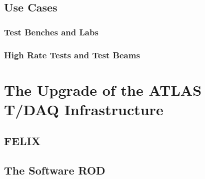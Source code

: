 \subsection{Use Cases}
\subsubsection{Test Benches and Labs}
\subsubsection{High Rate Tests and Test Beams}

\section{The Upgrade of the ATLAS T/DAQ Infrastructure}
\subsection{FELIX}
\subsection{The Software ROD}

